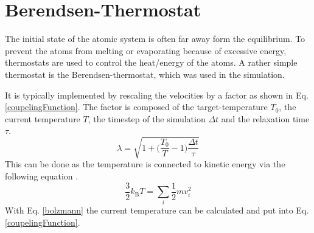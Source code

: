 \section{Berendsen-Thermostat}
\begin{comment}
- couple the moleclular system to a larger heat bath
- thermostat controls the heat of the simulation so the system does not melt or evaporate
\end{comment}
The initial state of the atomic system is often far away form the equilibrium. To prevent the atoms from melting or evaporating because of excessive energy, thermostats are used to control the heat/energy of the atoms. A rather simple thermostat is the Berendsen-thermostat, which was used in the simulation. 
\par
It is typically implemented by rescaling the velocities by a factor as shown in Eq.  \ref{coupelingFunction}. The factor is composed of the target-temperature $T_{0}$, the current temperature $T$, the timestep of the simulation $\Delta{t}$ and the relaxation time $\tau$. 
\begin{equation}
	\label{coupelingFunction}
	\lambda = \sqrt{1 + \bigg(\frac{T_{0}}{T} -1\bigg)\frac{\Delta t}{\tau}}
\end{equation}
This can be done as the temperature is connected to kinetic energy via the following equation \cite[cf.][]{molDymCourse}. 
\begin{equation}
	\label{bolzmann}
	\frac{3}{2} k_{\mathrm{B}} T = \sum_{i} \frac{1}{2} m v_{i}^2
\end{equation}
With Eq. \ref{bolzmann} the current temperature can be calculated and put into Eq. \ref{coupelingFunction}.


